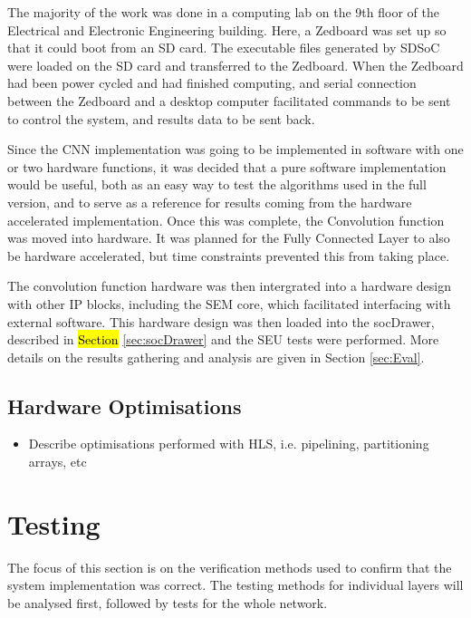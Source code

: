 \documentclass[12pt]{article}
\begin{document}
The majority of the work was done in a computing lab on the 9th floor of the Electrical and Electronic Engineering building. Here, a Zedboard was set up so that it could boot from an SD card. The executable files generated by SDSoC were loaded on the SD card and transferred to the Zedboard. When the Zedboard had been power cycled and had finished computing, and serial connection between the Zedboard and a desktop computer facilitated commands to be sent to control the system, and results data to be sent back.

Since the CNN implementation was going to be implemented in software with one or two hardware functions, it was decided that a pure software implementation would be useful, both as an easy way to test the algorithms used in the full version, and to serve as a reference for results coming from the hardware accelerated implementation. Once this was complete, the Convolution function was moved into hardware. It was planned for the Fully Connected Layer to also be hardware accelerated, but time constraints prevented this from taking place. 

The convolution function hardware was then intergrated into a hardware design with other IP blocks, including the SEM core, which facilitated interfacing with external software. This hardware design was then loaded into the socDrawer, described in \hl{Section} \ref{sec:socDrawer} and the SEU tests were performed. More details on the results gathering and analysis are given in Section \ref{sec:Eval}.

\subsection{Hardware Optimisations}
\label{sec:Imp-Optimisations}


\begin{itemize}
\item Describe optimisations performed with HLS, i.e. pipelining, partitioning arrays, etc
\end{itemize}

\newpage

\section{Testing}
\label{sec:Test}


The focus of this section is on the verification methods used to confirm that the system implementation was correct. The testing methods for individual layers will be analysed first, followed by tests for the whole network.
\end{document}
